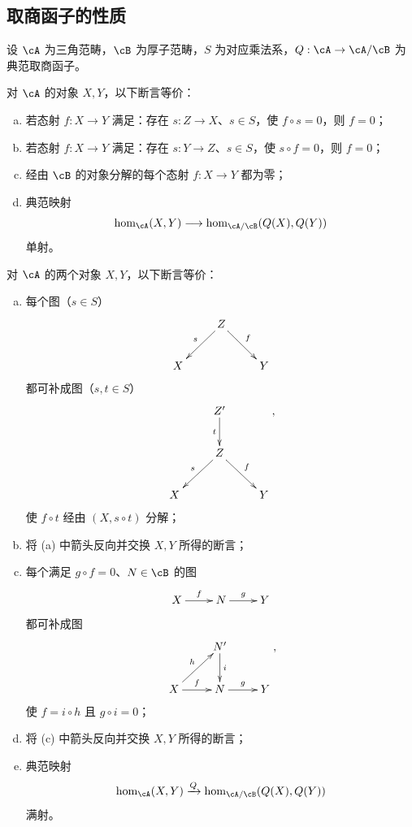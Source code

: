 \subsection{取商函子的性质}\label{VIII:2-5}
设 $\cA$ 为三角范畴，$\cB$ 为厚子范畴，$S$ 为对应乘法系，$Q:\cA\to\cA/\cB$ 为典范取商函子。
\begin{proposition}\label{VIII:2-5-1}
对 $\cA$ 的对象 $X,Y$，以下断言等价：
\begin{enumerate}[(a)]
\item 若态射 $f:X\to Y$ 满足：存在 $s:Z\to X$、$s\in S$，使 $f\circ s=0$，则 $f=0$；
\item 若态射 $f:X\to Y$ 满足：存在 $s:Y\to Z$、$s\in S$，使 $s\circ f=0$，则 $f=0$；
\item 经由 $\cB$ 的对象分解的每个态射 $f:X\to Y$ 都为零；
\item 典范映射
\[\hom_\cA(X,Y)\longrightarrow\hom_{\cA/\cB}(Q(X),Q(Y))\]
单射。
\end{enumerate}
\end{proposition}
\begin{proposition}\label{VIII:2-5-2}
对 $\cA$ 的两个对象 $X,Y$，以下断言等价：
\begin{enumerate}[(a)]
\item 每个图（$s\in S$）
\[\xymatrix{&Z\ar[dl]_-s\ar[dr]^-f\\X&&Y}\]
都可补成图（$s,t\in S$）
\[\xymatrix{&Z'\ar[d]_-t\\&Z\ar[dl]_-s\ar[dr]^-f\\X&&Y},\]
使 $f\circ t$ 经由 $(X,s\circ t)$ 分解；
\item 将 (a) 中箭头反向并交换 $X,Y$ 所得的断言；
\item 每个满足 $g\circ f=0$、$N\in\cB$ 的图
\[\xymatrix{X\ar[r]^-f&N\ar[r]^-g&Y}\]
都可补成图
\[\xymatrix{&N'\ar[d]^-i\\X\ar[ur]^-h\ar[r]^-f&N\ar[r]^-g&Y},\]
使 $f=i\circ h$ 且 $g\circ i=0$；
\item 将 (c) 中箭头反向并交换 $X,Y$ 所得的断言；
\item 典范映射
\[\hom_\cA(X,Y)\xrightarrow{Q}\hom_{\cA/\cB}(Q(X),Q(Y))\]
满射。
\end{enumerate}
\end{proposition}
